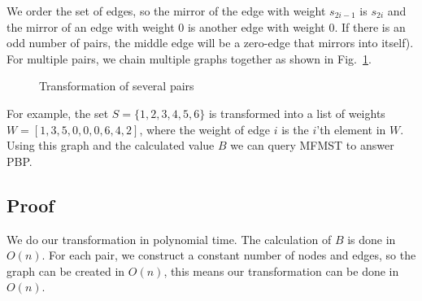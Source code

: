 We order the set of edges, so the mirror of the edge with weight $s_{2i-1}$ is $s_{2i}$ and the mirror of an edge with weight 0 is another edge with weight 0. If there is an odd number of pairs, the middle edge will be a zero-edge that mirrors into itself). For multiple pairs, we chain multiple graphs together as shown in Fig.~\ref{fig:transform2}. 
\begin{figure}[htb]
\centering
{}
\caption{Transformation of several pairs}
\label{fig:transform2}
\end{figure}

For example, the set $S=\lbrace 1,2,3,4,5,6 \rbrace$ is transformed into a list of weights $W=[1,3,5,0,0,0,6,4,2]$, where the weight of edge $i$ is the $i$'th element in $W$.
\noindent
Using this graph and the calculated value $B$ we can query MFMST to answer PBP.

\subsection{Proof}

We do our transformation in polynomial time. The calculation of $B$ is done in $O(n)$. For each pair, we construct a constant number of nodes and edges, so the graph can be created in $O(n)$, this means our transformation can be done in $O(n)$.

